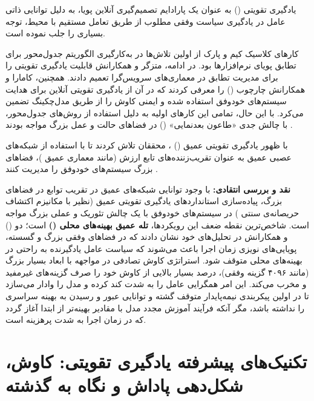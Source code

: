 \documentclass[oneside,openany,phd]{TMU-Thesis}
\begin{document}
یادگیری تقویتی () به عنوان یک پارادایم تصمیم‌گیری آنلاین پویا، به دلیل توانایی ذاتی عامل در یادگیری سیاست وفقی مطلوب از طریق تعامل مستقیم با محیط، توجه بسیاری را جلب نموده است. 

کارهای کلاسیک کیم و پارک \cite{kim2009reinforcement} از اولین تلاش‌ها در به‌کارگیری الگوریتم  جدول‌محور برای تطابق پویای نرم‌افزارها بود. در ادامه، متزگر و همکارانش \cite{metzger2022realizing} قابلیت یادگیری تقویتی را برای مدیریت تطابق در معماری‌های سرویس‌گرا تعمیم دادند. همچنین، کامارا و همکارانش \cite{camara2020quantitative} چارچوب  () را معرفی کردند که در آن از یادگیری تقویتی آنلاین برای هدایت سیستم‌های خودوفق استفاده شده و ایمنی کاوش را از طریق مدل‌چکینگ تضمین می‌کرد. با این حال، تمامی این کارهای اولیه به دلیل استفاده از روش‌های جدول‌محور، با چالش جدی «طاعون بعدنمایی» () در فضاهای حالت و عمل بزرگ مواجه بودند \cite{sutton2018reinforcement}.

با ظهور یادگیری تقویتی عمیق () \cite{mnih2015human}، محققان تلاش کردند تا با استفاده از شبکه‌های عصبی عمیق به عنوان تقریب‌زننده‌های تابع ارزش (مانند معماری عمیق )، فضاهای بزرگ سیستم‌های خودوفق را مدیریت کنند \cite{du2023scalability}.

\textbf{نقد و بررسی انتقادی:}
با وجود توانایی شبکه‌های عمیق در تقریب توابع در فضاهای بزرگ، پیاده‌سازی استانداردهای یادگیری تقویتی عمیق (نظیر  با مکانیزم اکتشاف حریصانه‌ی سنتی ) در سیستم‌های خودوفق با یک چالش تئوریک و عملی بزرگ مواجه است.
شاخص‌ترین نقطه ضعف این رویکردها، \textbf{تله عمیق بهینه‌های محلی ()} است؛ دو () و همکارانش \cite{du2023scalability} در تحلیل‌های خود نشان دادند که در فضاهای وفقی بزرگ و گسسته، پویایی‌های نویزی زمان اجرا باعث می‌شوند که سیاست عامل یادگیرنده به راحتی در بهینه‌های محلی متوقف شود. استراتژی کاوش تصادفی  در مواجهه با ابعاد بسیار بزرگ (مانند ۴۰۹۶ گزینه وفقی)، درصد بسیار بالایی از کاوش خود را صرف گزینه‌های غیرمفید و مخرب می‌کند. این امر همگرایی عامل را به شدت کند کرده و مدل را وادار می‌سازد تا در اولین پیکربندی نیمه‌پایدار متوقف گشته و توانایی عبور و رسیدن به بهینه سراسری را نداشته باشد، مگر آنکه فرآیند آموزش مجدد مدل با مقادیر بهینه‌تر از ابتدا آغاز گردد که در زمان اجرا به شدت پرهزینه است.

\section{تکنیک‌های پیشرفته یادگیری تقویتی: کاوش، شکل‌دهی پاداش و نگاه به گذشته}
\label{sec:ch3_advanced_rl}
\end{document}

